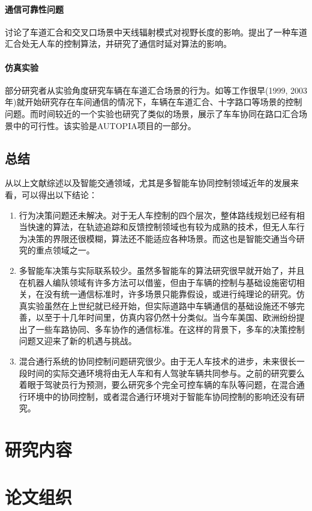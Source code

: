     \paragraph{通信可靠性问题}
    \cite{Abbas2013Radio}讨论了车道汇合和交叉口场景中天线辐射模式对视野长度的影响。\cite{Uno1999A}提出了一种车道汇合处无人车的控制算法，并研究了通信时延对算法的影响。
    \paragraph{仿真实验}
    部分研究者从实验角度研究车辆在车道汇合场景的行为。如\cite{Sakaguchi1999Inter,Kolodko2003Cooperative}等工作很早(1999, 2003年)就开始研究存在车间通信的情况下，车辆在车道汇合、十字路口等场景的控制问题。而时间较近的一个实验\cite{Milanes2011Automated}也研究了类似的场景，展示了车车协同在路口汇合场景中的可行性。该实验是AUTOPIA\cite{Milan2011AUTOPIA}项目的一部分。

  \subsection{总结}
  从以上文献综述以及智能交通领域，尤其是多智能车协同控制领域近年的发展来看，可以得出以下结论：

  \begin{enumerate}[label=(\arabic*)]
  \item 行为决策问题还未解决。对于无人车控制的四个层次，整体路线规划已经有相当快速的算法，在轨迹追踪和反馈控制领域也有较为成熟的技术，但无人车行为决策的界限还很模糊，算法还不能适应各种场景。而这也是智能交通当今研究的重点领域之一。
  \item 多智能车决策与实际联系较少。虽然多智能车的算法研究很早就开始了，并且在机器人编队领域有许多方法可以借鉴，但由于车辆的控制与基础设施密切相关，在没有统一通信标准时，许多场景只能靠假设，或进行纯理论的研究。仿真实验虽然在上世纪就已经开始，但实际道路中车辆通信的基础设施还不够完善，以至于十几年时间里，仿真内容仍然十分类似。当今车美国、欧洲纷纷提出了一些车路协同、多车协作的通信标准\cite{Chen2014Cooperative}。在这样的背景下，多车的决策控制问题又迎来了新的机遇与挑战。
  \item 混合通行系统的协同控制问题研究很少。由于无人车技术的进步，未来很长一段时间的实际交通环境将由无人车和有人驾驶车辆共同参与。之前的研究要么着眼于驾驶员行为预测，要么研究多个完全可控车辆的车队等问题，在混合通行环境中的协同控制，或者混合通行环境对于智能车协同控制的影响还没有研究。
  \end{enumerate}

\section{研究内容}

\section{论文组织}